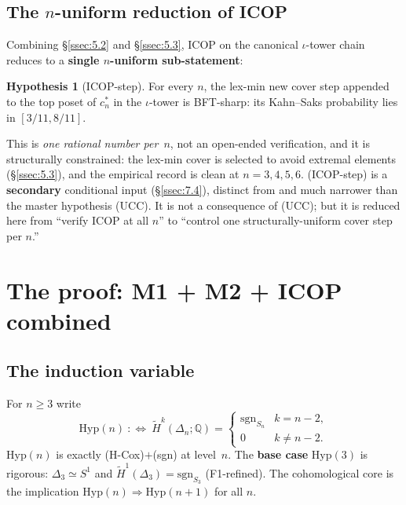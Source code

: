 \documentclass[11pt,reqno]{amsart}
\theoremstyle{plain}
\theoremstyle{definition}
\newtheorem{hypothesis}[theorem]{Hypothesis}
\newcommand{\Hred}{\widetilde H}
\newcommand{\sgn}{\mathrm{sgn}}
\newcommand{\Q}{\mathbb{Q}}
\newcommand{\Hyp}{\mathrm{Hyp}}
\newcommand{\cstar}[1]{c^{*}_{#1}}
\newcommand{\UCC}{\textup{(UCC)}}
\newcommand{\ICOPstep}{\textup{(ICOP-step)}}
\begin{document}
\subsection{The $n$-uniform reduction of ICOP}\label{ssec:5.4}
Combining \S\ref{ssec:5.2} and \S\ref{ssec:5.3}, ICOP on the canonical
$\iota$-tower chain reduces to a \textbf{single $n$-uniform
sub-statement}:
\begin{hypothesis}[ICOP-step]\label{hyp:icopstep}
For every $n$, the lex-min new cover step appended to the top poset of
$\cstar n$ in the $\iota$-tower is BFT-sharp: its Kahn--Saks probability
lies in $[3/11,8/11]$.
\end{hypothesis}
This is \emph{one rational number per~$n$}, not an open-ended
verification, and it is structurally constrained: the lex-min cover is
selected to avoid extremal elements (\S\ref{ssec:5.3}), and the
empirical record is clean at $n=3,4,5,6$. \ICOPstep{} is a
\textbf{secondary} conditional input (\S\ref{ssec:7.4}), distinct from
and much narrower than the master hypothesis \UCC. It is not a
consequence of \UCC; but it is reduced here from ``verify ICOP at all
$n$'' to ``control one structurally-uniform cover step per $n$.''

\section{The proof: M1 + M2 + ICOP combined}\label{sec:proof}

\subsection{The induction variable}\label{ssec:6.1}
For $n\ge3$ write
\[
  \Hyp(n)\ :\Longleftrightarrow\
  \Hred^k(\Delta_n;\Q)=
    \begin{cases}\sgn_{S_n} & k=n-2,\\ 0 & k\ne n-2.\end{cases}
\]
$\Hyp(n)$ is exactly (H-Cox)$+$(sgn) at level~$n$. The \textbf{base
case} $\Hyp(3)$ is rigorous: $\Delta_3\simeq S^1$ and
$\Hred^1(\Delta_3)=\sgn_{S_3}$ (F1-refined). The cohomological core is
the implication $\Hyp(n)\Rightarrow\Hyp(n+1)$ for all $n$.
\end{document}
